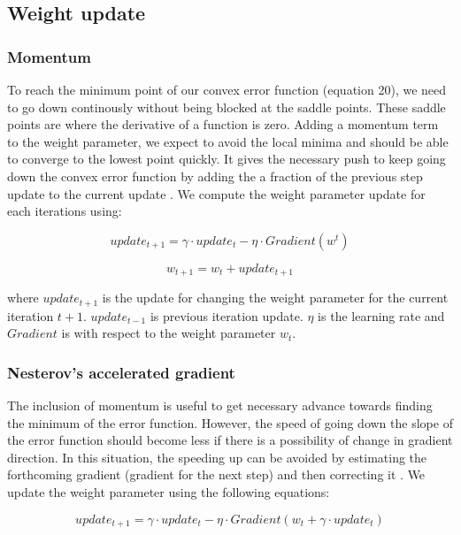 \subsection{Weight update}
\subsubsection{Momentum}
To reach the minimum point of our convex error function (equation 20), we need to go down continously without being blocked at the saddle points. These saddle points are where the derivative of a function is zero. Adding a momentum term to the weight parameter, we expect to avoid the local minima and should be able to converge to the lowest point quickly. It gives the necessary push to keep going down the convex error function by adding the a fraction of the previous step update to the current update \cite{articleRuderS, Sutskever}. We compute the weight parameter update for each iterations using:

\begin{equation}
update_{t+1} = \gamma \cdot update_{t} - \eta \cdot Gradient(w^t)
\end{equation}

\begin{equation}
w_{t+1} = w_t + update_{t+1}
\end{equation}

where $update_{t+1}$ is the update for changing the weight parameter for the current iteration $t+1$. $update_{t-1}$ is previous iteration update. $\eta$ is the learning rate and $Gradient$ is with respect to the weight parameter $w_t$. 

\subsubsection{Nesterov’s accelerated gradient}
The inclusion of momentum is useful to get necessary advance towards finding the minimum of the error function. However, the speed of going down the slope of the error function should become less if there is a possibility of change in gradient direction. In this situation, the speeding up can be avoided by estimating the forthcoming gradient (gradient for the next step) and then correcting it \cite{Botev}. We update the weight parameter using the following equations:

\begin{equation}
update_{t+1} = \gamma \cdot update_t - \eta \cdot Gradient(w_t + \gamma \cdot update_t)
\end{equation}

